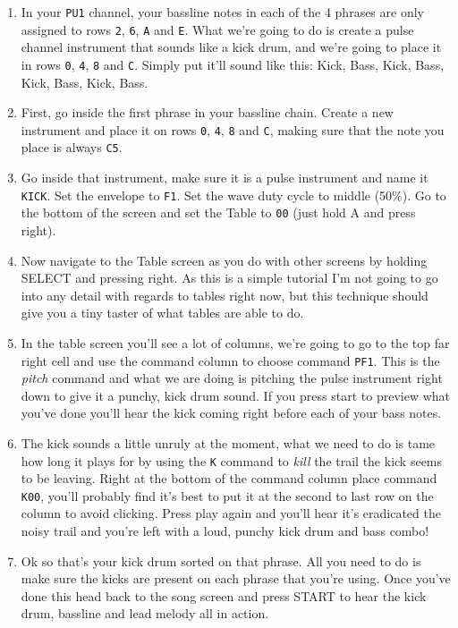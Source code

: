 \documentclass[]{article}
\newcommand{\buttonStyle}[1]{\textsf{#1}\xspace}
\newcommand{\bA}{\buttonStyle{A}}
\newcommand{\bStart}{\buttonStyle{{START}}}
\newcommand{\bSelect}{\buttonStyle{{SELECT}}}
\newcommand{\bRight}{\buttonStyle{right}}
\newcommand{\nb}[1]{\texttt{#1}\xspace}
\begin{document}
\begin{enumerate}

\item  In your \nb{PU1} channel, your bassline notes in each of the 4 phrases are only assigned to rows \nb{2}, \nb{6}, \nb{A} and \nb{E}. What we're going to do is create a pulse channel instrument that sounds like a kick drum, and we're going to place it in rows \nb{0}, \nb{4}, \nb{8} and \nb{C}. Simply put it'll sound like this: Kick, Bass, Kick, Bass, Kick, Bass, Kick, Bass.

\item First, go inside the first phrase in your bassline chain. Create a new instrument and place it on rows \nb{0}, \nb{4}, \nb{8} and \nb{C}, making sure that the note you place is always \nb{C5}.

\item Go inside that instrument, make sure it is a pulse instrument and name it \nb{KICK}. Set the envelope to \nb{F1}. Set the wave duty cycle to middle (50\%). Go to the bottom of the screen and set the Table to \nb{00} (just hold \bA and press \bRight).

\item Now navigate to the Table screen as you do with other screens by holding \bSelect and pressing \bRight. As this is a simple tutorial I'm not going to go into any detail with regards to tables right now, but this technique should give you a tiny taster of what tables are able to do.

\item In the table screen you'll see a lot of columns, we're going to go to the top far right cell and use the command column to choose command \nb{PF1}. This is the \textit{pitch} command and what we are doing is pitching the pulse instrument right down to give it a punchy, kick drum sound. If you press start to preview what you've done you'll hear the kick coming right before each of your bass notes.

\item The kick sounds a little unruly at the moment, what we need to do is tame how long it plays for by using the \nb{K} command to \textit{kill} the trail the kick seems to be leaving. Right at the bottom of the command column place command \nb{K00}, you'll probably find it's best to put it at the second to last row on the column to avoid clicking. Press play again and you'll hear it's eradicated the noisy trail and you're left with a loud, punchy kick drum and bass combo!

\item Ok so that's your kick drum sorted on that phrase. All you need to do is make sure the kicks are present on each phrase that you're using. Once you've done this head back to the song screen and press \bStart to hear the kick drum, bassline and lead melody all in action.

\end{enumerate}
\end{document}
